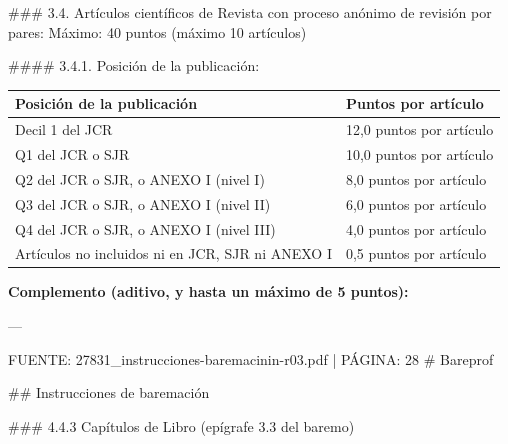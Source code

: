 \documentclass{article}
\begin{document}
\begin{itemize}
\begin{itemize}
\begin{scriptsize}
                  \#\#\# 3.4. Artículos científicos de Revista con proceso anónimo de revisión por pares: Máximo: 40 puntos
                  (máximo 10 artículos)

                  \#\#\#\# 3.4.1. Posición de la publicación:

                  \vspace{0.4cm}
                  \begin{table}[h!]\centering\renewcommand{\arraystretch}{1.3}
                    \begin{tabular}{|p{}|p{}|}\hline
                      Posición de la publicación                       & Puntos por artículo      \\\hline
                      Decil 1 del JCR                                  & 12,0 puntos por artículo \\\hline
                      Q1 del JCR o SJR                                 & 10,0 puntos por artículo \\\hline
                      Q2 del JCR o SJR, o ANEXO I (nivel I)            & 8,0 puntos por artículo  \\\hline
                      Q3 del JCR o SJR, o ANEXO I (nivel II)           & 6,0 puntos por artículo  \\\hline
                      Q4 del JCR o SJR, o ANEXO I (nivel III)          & 4,0 puntos por artículo  \\\hline
                      Artículos no incluidos ni en JCR, SJR ni ANEXO I & 0,5 puntos por artículo  \\\hline
                    \end{tabular}\end{table}
                  \vspace{0.4cm}

                  \textbf{Complemento (aditivo, y hasta un máximo de 5 puntos):}

                  ---

                  FUENTE: 27831\_instrucciones-baremacinin-r03.pdf | PÁGINA: 28
                  \# Bareprof

                  \#\# Instrucciones de baremación

                  \#\#\# 4.4.3 Capítulos de Libro (epígrafe 3.3 del baremo)


\end{scriptsize}
\end{itemize}
\end{itemize}
\end{document}
